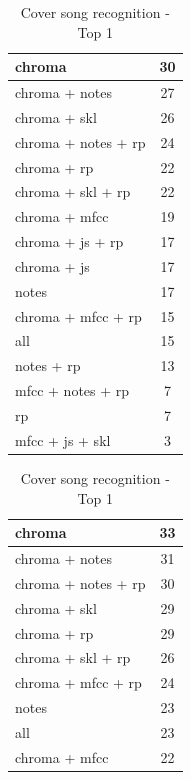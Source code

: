 \begin{table}[H]
	\begin{minipage}{0.5\textwidth}
		\begin{center}
			\begin{tabular}{|l||c|}
				\hline
				chroma & 30\\
				\hline
				chroma + notes & 27\\
				\hline
				chroma + skl & 26\\
				\hline
				chroma + notes + rp & 24\\
				\hline
				chroma + rp & 22\\
				\hline
				chroma + skl + rp & 22\\
				\hline
				chroma + mfcc & 19\\
				\hline
				chroma + js + rp & 17\\
				\hline
				chroma + js & 17\\
				\hline
				notes & 17\\
				\hline
				chroma + mfcc + rp & 15\\
				\hline
				all & 15\\
				\hline
				notes + rp & 13\\
				\hline
				mfcc + notes + rp & 7\\
				\hline
				rp & 7\\
				\hline
				mfcc + js + skl & 3\\
				\hline
			\end{tabular}
			\label{cov_1}
		\end{center}
		\caption{Cover song recognition - Top 1}
	\end{minipage}
	\begin{minipage}{0.5\textwidth}
		\begin{center}
			\begin{tabular}{|l||c|}
				\hline
				chroma & 33\\
				\hline
				chroma + notes & 31\\
				\hline
				chroma + notes + rp & 30\\
				\hline
				chroma + skl & 29\\
				\hline
				chroma + rp & 29\\
				\hline
				chroma + skl + rp & 26\\
				\hline
				chroma + mfcc + rp & 24\\
				\hline
				notes & 23\\
				\hline
				all & 23\\
				\hline
				chroma + mfcc & 22\\

\end{tabular}
\end{center}
\end{minipage}
\end{table}
